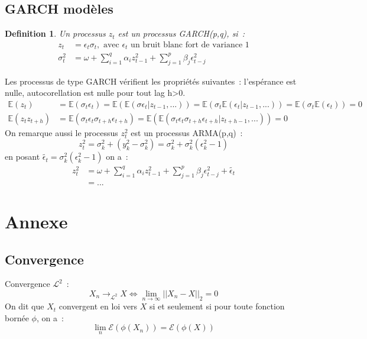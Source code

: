 \documentclass[11pt]{scrartcl} %
\newtheorem{Def}[theorem]{Definition}
\newcommand{\E}[1]{\mathbb{E}\left(#1\right)}
\begin{document}
\subsection{GARCH modèles}
\begin{Def}\label{GARCHDef}
Un processus $z_t$ est un processus GARCH(p,q), si~:
\begin{align*}
z_t&=\epsilon_t\sigma_t,\textrm{ avec }\epsilon_t \textrm{ un bruit blanc fort de variance 1}\\
\sigma_t^2 &= \omega  +\sum_{i=1}^q\alpha_i z_{t-1}^2+\sum_{j=1}^p\beta_j\epsilon_{t-j}^2
\end{align*}
\end{Def}
Les processus de type GARCH vérifient les propriétés suivantes~: l'espérance est nulle, autocorellation est nulle pour tout lag h>0.
\begin{align*}
\E{z_t}&= \E{\sigma_t\epsilon_t}=\E{\E{\sigma\epsilon_t|z_{t-1},...}}=\E{\sigma_t\E{\epsilon_t|z_{t-1},...}}=\E{\sigma_t\E{\epsilon_t}}=0\\
\E{z_tz_{t+h}}&=\E{\sigma_t\epsilon_t\sigma_{t+h}\epsilon_{t+h}}=\E{\E{\sigma_t\epsilon_t\sigma_{t+h}\epsilon_{t+h}|z_{t+h-1},...}}=0
\end{align*}
On remarque aussi le processus $z_t^2$ est un processus ARMA(p,q)~:
$$
z_t^2= \sigma_k^2+(y_k^2-\sigma_k^2)=\sigma_k^2+\sigma_k^2(\epsilon_k^2-1)
$$
en posant $\tilde{\epsilon_t}=\sigma_k^2(\epsilon_k^2-1)$ on a~:
\begin{align*}
z_t^2&= \omega  +\sum_{i=1}^q\alpha_i z_{t-1}^2+\sum_{j=1}^p\beta_j\epsilon_{t-j}^2 + \tilde{\epsilon_t}\\
&=...
\end{align*}
\section{Annexe}
\subsection{Convergence}
Convergence $\mathcal{L}^2$~:
$$
X_n\rightarrow_{\mathcal{L^2}} X \Leftrightarrow  \lim_{n\rightarrow \infty}||X_n-X||_2=0
$$
On dit que $X_t$ convergent en loi vers $X$ si et seulement si pour toute fonction bornée $\phi$, on a~:~
$$
\lim_{n}\mathcal{E}(\phi(X_n))=\mathcal{E}\left(\phi(X)\right)
$$
\end{document}
